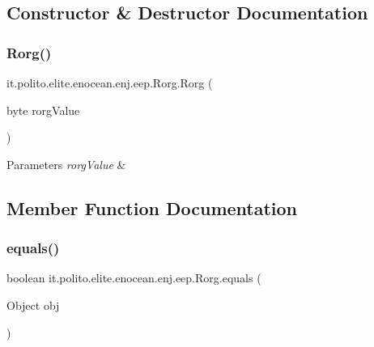 \subsection{Constructor \& Destructor Documentation}
\hypertarget{classit_1_1polito_1_1elite_1_1enocean_1_1enj_1_1eep_1_1_rorg_acf3c5628aa2de289700793b6b56d22a6}{}\label{classit_1_1polito_1_1elite_1_1enocean_1_1enj_1_1eep_1_1_rorg_acf3c5628aa2de289700793b6b56d22a6} 
\subsubsection{\texorpdfstring{Rorg()}{Rorg()}}
{\footnotesize\ttfamily it.\+polito.\+elite.\+enocean.\+enj.\+eep.\+Rorg.\+Rorg (\begin{DoxyParamCaption}\item[{byte}]{rorg\+Value }\end{DoxyParamCaption})}


\begin{DoxyParams}{Parameters}
{\em rorg\+Value} & \\
\hline
\end{DoxyParams}


\subsection{Member Function Documentation}
\hypertarget{classit_1_1polito_1_1elite_1_1enocean_1_1enj_1_1eep_1_1_rorg_ab38b7a85897adc6a5fad1705918d4cc6}{}\label{classit_1_1polito_1_1elite_1_1enocean_1_1enj_1_1eep_1_1_rorg_ab38b7a85897adc6a5fad1705918d4cc6} 
\subsubsection{\texorpdfstring{equals()}{equals()}}
{\footnotesize\ttfamily boolean it.\+polito.\+elite.\+enocean.\+enj.\+eep.\+Rorg.\+equals (\begin{DoxyParamCaption}\item[{Object}]{obj }\end{DoxyParamCaption})}

